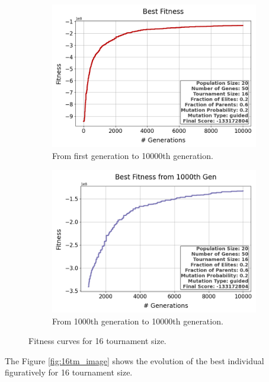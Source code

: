 \documentclass{assignment}
\begin{document}
\begin{figure}[H]
    \begin{subfigure}{0.5\textwidth}
        \includegraphics[width=\textwidth]{figures/best_fitness_output_20_50_16_0.2_0.6_0.2_guided.png}
        \caption{From first generation to 10000th generation.}
    \end{subfigure}\hfill
    \begin{subfigure}{0.5\textwidth}
        \includegraphics[width=\textwidth]{figures/best_fitness_1000_output_20_50_16_0.2_0.6_0.2_guided.png}
        \caption{From 1000th generation to 10000th generation.}
    \end{subfigure}
    \caption{Fitness curves for 16 tournament size.}
\label{fig:16tm}
\end{figure}

The Figure \ref{fig:16tm_image} shows the evolution of the best individual figuratively for 16 tournament size.
\end{document}
